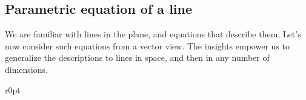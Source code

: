 






\subsection{Parametric equation of a line}
\label{sec:pel}

We are familiar with lines in the plane, and equations that describe them. 
Let's now consider such equations from a vector view.
The insights empower us to generalize the descriptions to lines in space, and then in any number of dimensions.

\begin{wrapfigure}[6]r{0pt} 
\end{wrapfigure}

